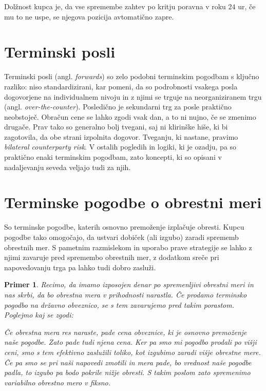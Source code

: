 \documentclass[a4paper, 11pt]{article}
\newtheorem{primer}{Primer}
\begin{document}
Dolžnost kupca je, da vse spremembe zahtev po kritju poravna v roku $24$ ur, če mu to ne uspe, se
njegova pozicija avtomatično zapre.

\section{Terminski posli}
Terminski posli (angl. \textit{forwards}) so zelo podobni terminskim pogodbam s ključno razliko:
niso standardizirani, kar pomeni, da so podrobnosti vsakega posla dogovorjene na individualnem nivoju 
in z njimi se trguje na neorganiziranem trgu (angl. \textit{over-the-counter}). Posledično je sekundarni 
trg za posle praktično neobstoječ. Obračun cene se lahko zgodi vsak dan, a to ni nujno, če se zmenimo 
drugače. Prav tako so generalno bolj tvegani, saj ni klirinške hiše, ki bi zagotovila, da obe strani 
izpolnita dogovor. Tveganju, ki nastane, pravimo \textit{bilateral counterparty risk}. V ostalih pogledih
in logiki, ki je ozadju, pa so praktično enaki terminskim pogodbam, zato koncepti, ki so opisani v 
nadaljevanju seveda veljajo tudi za njih.

\section{Terminske pogodbe o obrestni meri}
So terminske pogodbe, katerih osnovno premoženje izplačuje obresti. Kupcu pogodbe tako omogočajo, da 
ustvari dobiček (ali izgubo) zaradi sprememb obrestnih mer. S pametnim razmislekom in uporabo prave 
strategije se lahko z njimi zavaruje pred spremembo obrestnih mer, z dodatkom sreče pri napovedovanju
trga pa lahko tudi dobro zasluži.

\begin{primer}
    Recimo, da imamo izposojen denar po spremenljivi obrestni meri in nas skrbi, da bo obrestna mera v 
    prihodnosti narastla. Če prodamo terminsko pogodbo na državno obveznico, se s tem zavarujemo pred 
    takim porastom. Poglejmo kaj se zgodi:

    Če obrestna mera res naraste, pade cena obveznice, ki je osnovno premoženje naše pogodbe. Zato pade
    tudi njena cena. Ker pa smo mi pogodbo prodali po višji ceni, smo s tem efektivno zaslužili toliko, 
    kot izgubimo zaradi višje obrestne mere. Če pa smo se pri naši napovedi zmotili in mera pade, bo 
    vrednost naše pogodbe padla, to izgubo pa bodo pokrile nižje obresti. S takim poslom zato spremenimo
    variabilno obrestno mero v fiksno. 
\end{primer}
\end{document}

